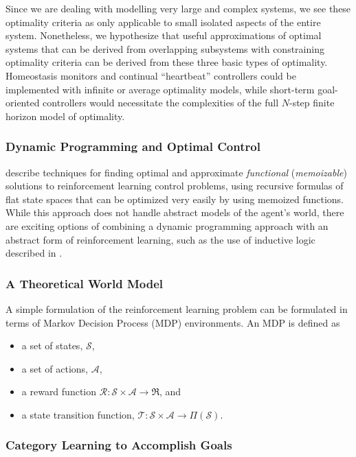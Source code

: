 Since we are dealing with modelling very large and complex systems, we see these optimality criteria as only applicable to small isolated aspects of the entire system.
Nonetheless, we hypothesize that useful approximations of optimal systems that can be derived from overlapping subsystems with constraining optimality criteria can be derived from these three basic types of optimality.
Homeostasis monitors and continual ``heartbeat'' controllers could be implemented with infinite or average optimality models, while short-term goal-oriented controllers would necessitate the complexities of the full $N$-step finite horizon model of optimality.

\subsubsection{Dynamic Programming and Optimal Control}

\cite{bertsekas:1995} describe techniques for finding optimal and approximate \emph{functional} (\emph{memoizable}) solutions to reinforcement learning control problems, using recursive formulas of flat state spaces that can be optimized very easily by using memoized functions.
While this approach does not handle abstract models of the agent's world, there are exciting options of combining a dynamic programming approach with an abstract form of reinforcement learning, such as the use of inductive logic described in \cite{dvzeroski:2001}.

\subsubsection{A Theoretical World Model}

A simple formulation of the reinforcement learning problem can be formulated in terms of Markov Decision Process (MDP) environments.
An MDP is defined as

\begin{itemize}
\item{a set of states, $\mathcal{S}$,}
\item{a set of actions, $\mathcal{A}$,}
\item{a reward function $\mathcal{R}:\mathcal{S}\times\mathcal{A}\rightarrow\Re$, and}
\item{a state transition function, $\mathcal{T}:\mathcal{S}\times\mathcal{A}\rightarrow\Pi{(\mathcal{S})}$.}
\end{itemize}

\subsubsection{Category Learning to Accomplish Goals}

